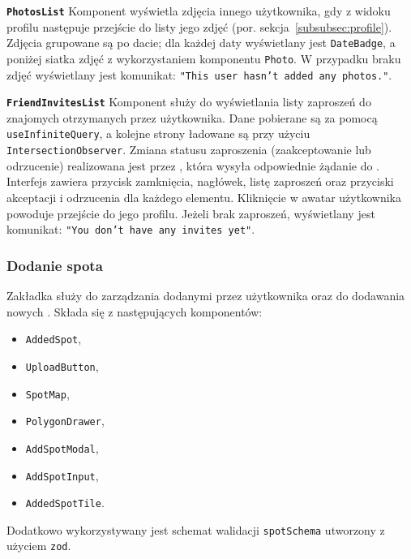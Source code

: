 \textbf{\texttt{PhotosList}}
Komponent wyświetla zdjęcia innego użytkownika, gdy z widoku profilu następuje przejście do listy jego zdjęć
(por. sekcja~\ref{subsubsec:profile}).
Zdjęcia grupowane są po dacie; dla każdej daty wyświetlany jest \texttt{DateBadge}, a poniżej siatka zdjęć z
wykorzystaniem komponentu \texttt{Photo}.
W przypadku braku zdjęć wyświetlany jest komunikat:
\texttt{"This user hasn't added any photos."}.

\textbf{\texttt{FriendInvitesList}}
Komponent służy do wyświetlania listy zaproszeń do znajomych otrzymanych przez użytkownika. \newline
Dane pobierane są za pomocą \texttt{useInfiniteQuery}, a kolejne strony ładowane są przy użyciu \texttt{IntersectionObserver}.
Zmiana statusu zaproszenia (zaakceptowanie lub odrzucenie) realizowana jest przez ,
która wysyła odpowiednie żądanie do .
Interfejs zawiera przycisk zamknięcia, nagłówek, listę zaproszeń oraz przyciski akceptacji i odrzucenia dla każdego elementu.
Kliknięcie w awatar użytkownika powoduje przejście do jego profilu.
Jeżeli brak zaproszeń, wyświetlany jest komunikat:
\texttt{"You don't have any invites yet"}.

\subsubsection{Dodanie spota}
\label{subsubsec:add-spot}

Zakładka służy do zarządzania  dodanymi przez użytkownika oraz do
dodawania nowych .
Składa się z następujących komponentów:

\begin{itemize}
    \item \texttt{AddedSpot},
    \item \texttt{UploadButton},
    \item \texttt{SpotMap},
    \item \texttt{PolygonDrawer},
    \item \texttt{AddSpotModal},
    \item \texttt{AddSpotInput},
    \item \texttt{AddedSpotTile}.
\end{itemize}

Dodatkowo wykorzystywany jest schemat walidacji \texttt{spotSchema} utworzony z użyciem  \texttt{zod}.

